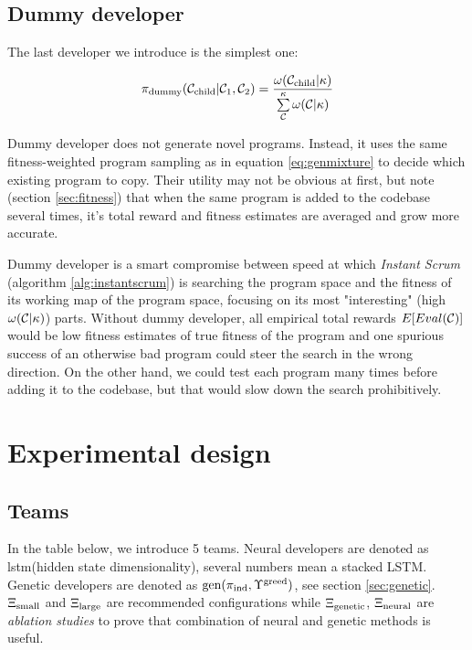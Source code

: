 \newpage \subsection{Dummy developer}

The last developer we introduce is the simplest one:

\begin{equation}
    \pi_\text{dummy}(\mathcal{C}_\text{child}|\mathcal{C}_1,\mathcal{C}_2) = 
    \frac{\omega(\mathcal{C}_\text{child}|\kappa)}{\sum\limits_{\mathcal{C}}^{\kappa} \omega(\mathcal{C}|\kappa)} 
    \label{eq:dummy}
\end{equation}

Dummy developer does not generate novel programs.
Instead, it uses the same fitness-weighted program sampling as in equation \ref{eq:genmixture} to decide which existing program to copy.
Their utility may not be obvious at first, but note (section \ref{sec:fitness}) that when the same program is added to the codebase several times, it's total reward and fitness estimates are averaged and grow more accurate.

Dummy developer is a smart compromise between speed at which \emph{Instant Scrum} (algorithm \ref{alg:instantscrum}) is searching the program space and the fitness of its working map of the program space, focusing on its most "interesting" (high $\omega(\mathcal{C}|\kappa)$) parts. 
Without dummy developer, all empirical total rewards $E[Eval(\mathcal{C})]$ would be low fitness estimates of true fitness of the program and one spurious success of an otherwise bad program could steer the search in the wrong direction.
On the other hand, we could test each program many times before adding it to the codebase, but that would slow down the search prohibitively. 

\newpage
\section{Experimental design}

\subsection{Teams}

In the table below, we introduce 5 teams.
Neural developers are denoted as lstm(hidden state dimensionality), several numbers mean a stacked LSTM.
Genetic developers are denoted as $\text{gen}(\pi_\text{ind},\Upsilon^\text{greed})$, see section \ref{sec:genetic}.
$\Xi_\text{small}$ and $\Xi_\text{large}$ are recommended configurations while $\Xi_\text{genetic}$, $\Xi_\text{neural}$ are \emph{ablation studies} to prove that combination of neural and genetic methods is useful.

